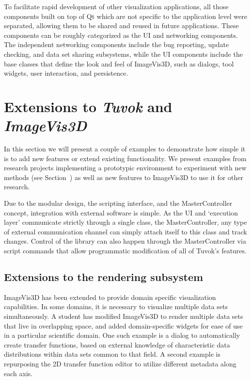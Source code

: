 To facilitate rapid development of other visualization applications,
all those components built on top of Qt which are
not specific to the application level were separated, allowing
them to be shared and reused in future applications. These
components can be roughly categorized as the UI and networking
components. The independent networking components
include the bug reporting, update checking, and data
set sharing subsystems, while the UI components include
the base classes that define the look and feel of ImageVis3D,
such as dialogs, tool widgets, user interaction, and persistence.

\section{Extensions to \textit{Tuvok} and \textit{ImageVis3D}}

In this section we will present a couple of examples to
demonstrate how simple it is to add new features or extend
existing functionality. We present examples from research
projects implementing a prototypic environment to experiment
with new methods (see Section~\todo{\ref{fixme}}) as well as new
features to ImageVis3D to use it for other research.

Due to the modular design, the scripting interface, and
the MasterController concept, integration with external software
is simple. As the UI and `execution layer' communicate
strictly through a single class, the MasterController, any
type of external communication channel can simply attach
itself to this class and track changes. Control of the library
can also happen through the MasterController via script
commands that allow programmatic modification of all of
Tuvok's features.

\subsection{Extensions to the rendering subsystem}

ImageVis3D has been extended to provide domain specific
visualization capabilities. In some domains, it is necessary
to visualize multiple data sets simultaneously. A student has
modified ImageVis3D to render multiple data sets that live in
overlapping space, and added domain-specific widgets for
ease of use in a particular scientific domain. One such example
is a dialog to automatically create transfer functions,
based on external knowledge of characteristic data distributions
within data sets common to that field. A second example
is repurposing the 2D transfer function editor to utilize
different metadata along each axis.

